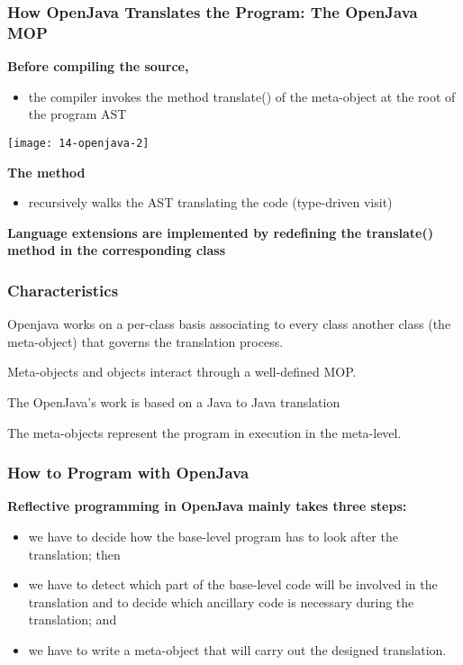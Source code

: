\subsubsection{How OpenJava Translates the Program: The OpenJava MOP}

\textbf{Before compiling the source,}

\begin{itemize}
	\item the compiler invokes the method translate() of the meta-object at the root of the program AST
\end{itemize}

\begin{center}
\texttt{[image: 14-openjava-2]}
\end{center}

\textbf{The method}

\begin{itemize}
	\item recursively walks the AST translating the code (type-driven visit)
\end{itemize}

\textbf{Language extensions are implemented by redefining the translate() method in the corresponding class}

\subsubsection{Characteristics}

Openjava works on a per-class basis associating to every class another class (the meta-object) that governs the translation process.

Meta-objects and objects interact through a well-defined MOP.

The OpenJava’s work is based on a Java to Java translation

The meta-objects represent the program in execution in the meta-level.

\subsubsection{How to Program with OpenJava}

\textbf{Reflective programming in OpenJava mainly takes three steps:}

\begin{itemize}
	\item we have to decide how the base-level program has to look after the translation; then
	\item we have to detect which part of the base-level code will be involved in the translation and to decide which ancillary code is necessary during the translation; and
	\item we have to write a meta-object that will carry out the designed translation.
\end{itemize}

